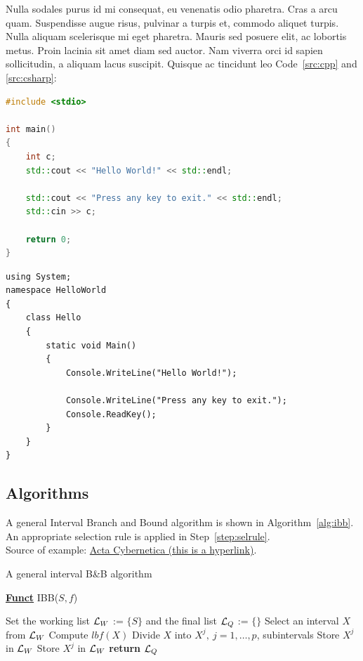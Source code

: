 Nulla sodales purus id mi consequat, eu venenatis odio pharetra. Cras a arcu quam. Suspendisse augue risus, pulvinar a turpis et, 
commodo aliquet turpis. Nulla aliquam scelerisque mi eget pharetra. Mauris sed posuere elit, ac lobortis metus. Proin lacinia sit
amet diam sed auctor. Nam viverra orci id sapien sollicitudin, a aliquam lacus suscipit. Quisque ac tincidunt leo Code~\ref{src:cpp}
and \ref{src:csharp}:

\begin{lstlisting}[language={C++}]
#include <stdio>

int main() 
{
	int c;
	std::cout << "Hello World!" << std::endl;

	std::cout << "Press any key to exit." << std::endl;
	std::cin >> c;
	
	return 0;
}
\end{lstlisting}

\begin{lstlisting}[language={[Sharp]C}]
using System;
namespace HelloWorld
{
	class Hello 
	{
		static void Main() 
		{
			Console.WriteLine("Hello World!");
			
			Console.WriteLine("Press any key to exit.");
			Console.ReadKey();
		}
	}
}
\end{lstlisting}

\subsection{Algorithms}

A general Interval Branch and Bound algorithm is shown in Algorithm~\ref{alg:ibb}. An appropriate selection rule is applied
in Step~\ref{step:selrule}.\\
Source of example: \href{https://www.inf.u-szeged.hu/actacybernetica/}{Acta Cybernetica (this is a hyperlink)}.

\begin{algorithm}[H]
\caption{A general interval B\&B algorithm} 
\label{alg:ibb} 
\textbf{\underline{Funct}} IBB($S,f$)
\begin{algorithmic}[1] %
\State Set the working list ${\cal L}_W$ := $\{S\}$ and the final list ${\cal L}_Q$ := $\{\}$     
 \label{alg:igoend}
	\State  Select an interval $X$ from ${\cal L}_W$ \label{step:selrule}  
	\State Compute $lbf(X)$ 		  
	 
		\State Divide $X$ into $X^j,\ j=1,\dots, p$, subintervals   
			 
				\State Store $X^j$ in ${\cal L}_W$ 
			\Else
				\State Store $X^j$ in ${\cal L}_W$ 
			\EndIf
		\EndFor  
	\EndIf
\EndWhile
\State \textbf{return} ${\cal L}_Q$
\end{algorithmic}
\end{algorithm}
\fi